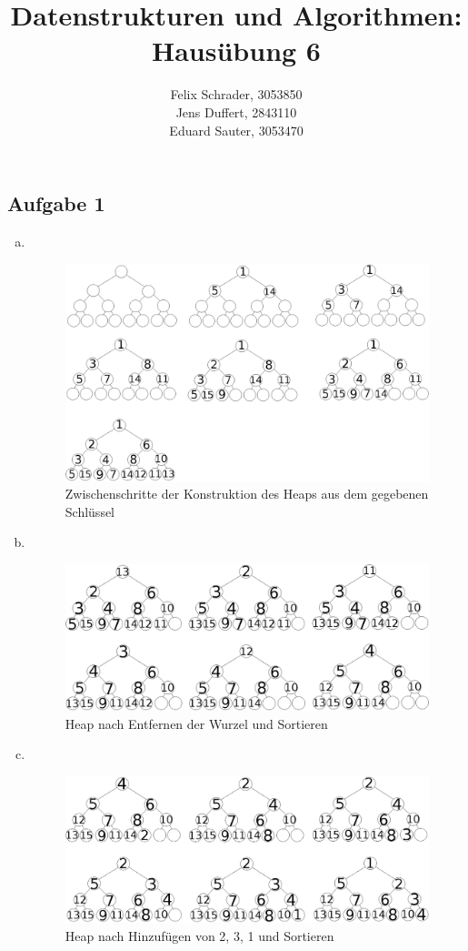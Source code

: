 \documentclass[11pt]{article}
\author{
  Felix Schrader, 3053850 \\ 
  Jens Duffert, 2843110 \\
  Eduard Sauter, 3053470
}
\title{Datenstrukturen und Algorithmen: Haus\"ubung 6}
\begin{document}
\maketitle
  \subsection*{Aufgabe 1}
  \begin{enumerate}[a)]
    \item $ $
      \begin{figure}[h!]
      \centering
      \includegraphics[width=\textwidth]{a1a_trees}
      \caption{Zwischenschritte der Konstruktion des Heaps aus dem gegebenen Schlüssel}
      \end{figure}
    \item $ $
      \begin{figure}[h!]
      \centering
      \includegraphics[width=\textwidth]{a1b_trees}
      \caption{Heap nach Entfernen der Wurzel und Sortieren}
      \end{figure}
    \pagebreak
    \item $ $
      \begin{figure}[h!]
      \centering
      \includegraphics[width=\textwidth]{a1c_trees}
      \caption{Heap nach Hinzufügen von 2, 3, 1 und Sortieren}
      \end{figure}
  \end{enumerate}
\end{document}
